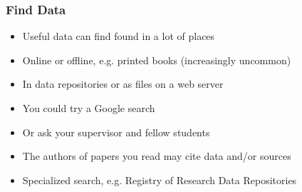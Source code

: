 \documentclass{beamer}
\begin{document}
\begin{frame}
  \frametitle{Find Data}
  
  \begin{itemize}
  \item Useful data can find found in a lot of places
  \item Online or offline, e.g. printed books (increasingly uncommon)
  \item In data repositories or as files on a web server
  \item You could try a Google search
  \item Or ask your supervisor and fellow students
  \item The authors of papers you read may cite data and/or sources
  \item Specialized search, e.g. Registry of Research Data Repositories
  \end{itemize}
\end{frame}

{
	\begin{frame}[plain]
	\end{frame}
}
\end{document}
